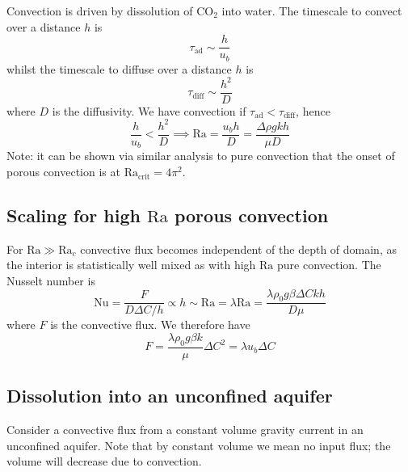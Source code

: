 \documentclass{jknotes}
\newcommand{\Ra}{\text{Ra}}
\begin{document}
Convection is driven by dissolution of CO$_2$ into water. The timescale to
convect over a distance $h$ is 
\begin{equation}
	\tau_{\text{ad}} \sim \frac{h}{u_b}
\end{equation}
whilst the timescale to diffuse over a distance $h$ is
\begin{equation}
	\tau_{\text{diff}} \sim \frac{h^2}{D}
\end{equation}
where $D$ is the diffusivity. We have convection if $\tau_{\text{ad}} <
\tau_{\text{diff}}$, hence
\begin{equation}
	\frac{h}{u_b} < \frac{h^2}{D} \implies \Ra = \frac{u_b h}{D} =
	\frac{\Delta \rho g k h }{\mu D}
\end{equation}
Note: it can be shown via similar analysis to pure convection that the onset
of porous convection is at $\Ra_{\text{crit}} = 4\pi^2$.

\subsection{Scaling for high $\Ra$ porous convection}
For $\Ra \gg \Ra_c$ convective flux becomes independent of the depth of
domain, as the interior is statistically well mixed as with high $\Ra$ pure
convection. The Nusselt number is
\begin{equation}
	\text{Nu} = \frac{F}{D\Delta C/h} \propto h \sim \Ra = \lambda \Ra =
	\frac{\lambda \rho_0 g \beta \Delta C k h}{D \mu}
\end{equation}
where $F$ is the convective flux. We therefore have
\begin{equation}
	F = \frac{\lambda \rho_0 g \beta k}{\mu} \Delta C^2 = \lambda u_b \Delta C
\end{equation}

\subsection{Dissolution into an unconfined aquifer}
Consider a convective flux from a constant volume gravity current in an
unconfined aquifer. Note that by constant volume we mean no input flux; the
volume will decrease due to convection.
\begin{center}
\end{center}
\end{document}
